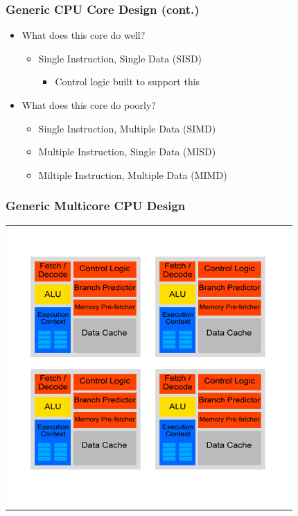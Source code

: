\documentclass{beamer}
\begin{document}
\begin{frame}
	\frametitle{Generic CPU Core Design (cont.)}
	\begin{itemize}
		\item What does this core do well?
		\begin{itemize}
			\item Single Instruction, Single Data (SISD)
			\begin{itemize}
				\item Control logic built to support this
			\end{itemize}
		\end{itemize}
		\item What does this core do poorly?
		\begin{itemize}
			\item Single Instruction, Multiple Data (SIMD)
			\item Multiple Instruction, Single Data (MISD)
			\item Miltiple Instruction, Multiple Data (MIMD)
		\end{itemize}
	\end{itemize}
\end{frame}

\begin{frame}
	\frametitle{Generic Multicore CPU Design}
	\begin{tabular}{c}
		\includegraphics[width=.75\textwidth]{Multicore-CPU-design.jpg}
	\end{tabular}
\end{frame}
\end{document}
